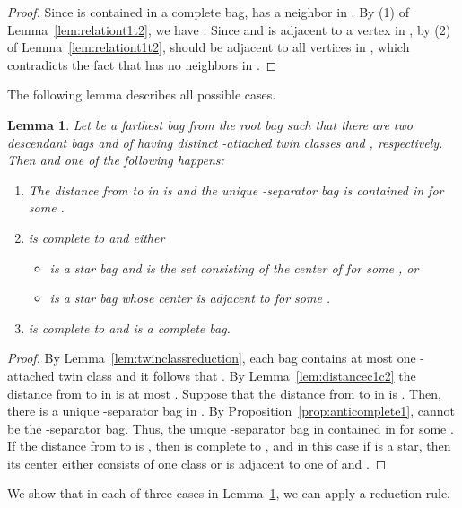 \documentclass[11pt]{elsarticle}
\newtheorem{lemma}[theorem]{Lemma}
\begin{document}
\begin{proof}
Since  is contained in a complete bag,  has a neighbor in .
By (1) of Lemma~\ref{lem:relationt1t2}, we have .
Since  and  is adjacent to a vertex in , by (2) of Lemma~\ref{lem:relationt1t2},  should be adjacent to all vertices in , which contradicts the fact that  has no neighbors in .
\end{proof}

The following lemma describes all possible cases.

\begin{lemma}\label{lem:twosattachedbags}
Let  be a farthest bag from the root bag 
 such that there are two descendant bags  and  of  having distinct -attached twin classes  and , respectively.
Then  and one of the following happens:
\begin{enumerate}
\item The distance from  to  in  is  and the unique -separator bag is contained in  for some .
\item   is complete to  and either
\begin{itemize}
\item  is a star bag and  is the set consisting of the center of  for some , or
\item   is a star bag whose center is adjacent to  for some .
\end{itemize}
\item   is complete to  and  is a complete bag.
\end{enumerate}
\end{lemma}
\begin{proof}


 
By Lemma~\ref{lem:twinclassreduction}, each bag contains at most one -attached twin class and it follows that .
By Lemma~\ref{lem:distancec1c2}
the distance from  to  in  is at most .
Suppose that the distance from  to  in  is . 
Then, there is a unique -separator bag in .
By Proposition~\ref{prop:anticomplete1},  cannot be the -separator bag.
Thus, the unique -separator bag in contained in  for some .
If the distance from  to  is , then  is complete to , 
and in this case if  is a star, then its center either consists of one class  or is adjacent to one of  and .
\end{proof}


We show that in each of three cases in Lemma~\ref{lem:twosattachedbags}, 
we can apply a reduction rule.
\end{document}
